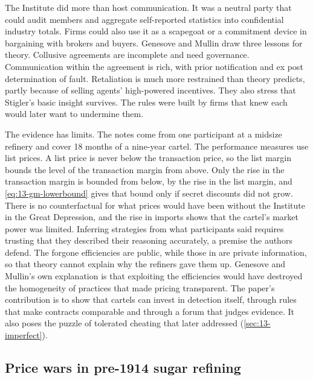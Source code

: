 The Institute did more than host communication. It was a neutral party that could audit members and aggregate
self-reported statistics into confidential industry totals. Firms could also use it as a scapegoat or a
commitment device in bargaining with brokers and buyers. Genesove and Mullin draw three lessons for theory.
Collusive agreements are incomplete and need governance. Communication within the agreement is rich, with prior
notification and ex post determination of fault. Retaliation is much more restrained than theory predicts,
partly because of selling agents' high-powered incentives. They also stress that Stigler's basic insight
survives. The rules were built by firms that knew each would later want to undermine them.

The evidence has limits. The notes come from one participant at a midsize refinery and cover 18 months of a
nine-year cartel. The performance measures use list prices. A list price is never below the transaction price, so the list
margin bounds the level of the transaction margin from above. Only the rise in the transaction margin is bounded
from below, by the rise in the list margin, and \eqref{eq:13-gm-lowerbound} gives that bound only if secret
discounts did not grow. There is no counterfactual for what prices would have been without the
Institute in the Great Depression, and the rise in imports shows that the cartel's market power was limited.
Inferring strategies from what participants said requires trusting that they described their reasoning
accurately, a premise the authors defend. The forgone efficiencies are public, while those in
\citet{AtheyBagwellSanchirico2004} are private information, so that theory cannot explain why the refiners gave
them up. Genesove and Mullin's own explanation is that exploiting the efficiencies would have destroyed the
homogeneity of practices that made pricing transparent. The paper's contribution is to show that cartels can
invest in detection itself, through rules that make contracts comparable and through a forum that judges
evidence. It also poses the puzzle of tolerated cheating that \citet{BernheimMadsen2017} later addressed
(\cref{sec:13-imperfect}).

\subsection{Price wars in pre-1914 sugar refining}\label{sec:13-gm-pricewars}

